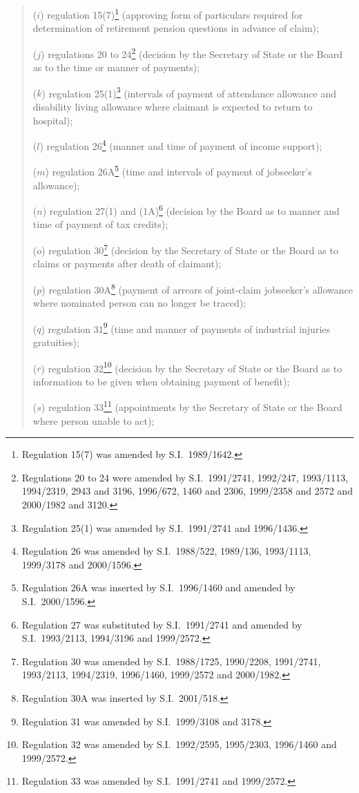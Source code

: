 \documentclass[12pt,a4paper]{article}
\begin{document}
\begin{enumerate}
\begin{quotation}
\begin{enumerate}
($i$) regulation 15(7)\footnote{Regulation 15(7) was amended by S.I.\ 1989/1642.} (approving form of particulars required for determination of retirement pension questions in advance of claim);

($j$) regulations 20 to 24\footnote{Regulations 20 to 24 were amended by S.I.\ 1991/2741, 1992/247, 1993/1113, 1994/2319, 2943 and 3196, 1996/672, 1460 and 2306, 1999/2358 and 2572 and 2000/1982 and 3120.} (decision by the Secretary of State or the Board as to the time or manner of payments);

($k$) regulation 25(1)\footnote{Regulation 25(1) was amended by S.I.\ 1991/2741 and 1996/1436.} (intervals of payment of attendance allowance and disability living allowance where claimant is expected to return to hospital);

($l$) regulation 26\footnote{Regulation 26 was amended by S.I.\ 1988/522, 1989/136, 1993/1113, 1999/3178 and 2000/1596.} (manner and time of payment of income support);

($m$) regulation 26A\footnote{Regulation 26A was inserted by S.I.\ 1996/1460 and amended by S.I.\ 2000/1596.} (time and intervals of payment of jobseeker’s allowance);

($n$) regulation 27(1) and (1A)\footnote{Regulation 27 was substituted by S.I.\ 1991/2741 and amended by S.I.\ 1993/2113, 1994/3196 and 1999/2572.} (decision by the Board as to manner and time of payment of tax credits);

($o$) regulation 30\footnote{Regulation 30 was amended by S.I.\ 1988/1725, 1990/2208, 1991/2741, 1993/2113, 1994/2319, 1996/1460, 1999/2572 and 2000/1982.} (decision by the Secretary of State or the Board as to claims or payments after death of claimant);

($p$) regulation 30A\footnote{Regulation 30A was inserted by S.I.\ 2001/518.} (payment of arrears of joint-claim jobseeker’s allowance where nominated person can no longer be traced);

($q$) regulation 31\footnote{Regulation 31 was amended by S.I.\ 1999/3108 and 3178.} (time and manner of payments of industrial injuries gratuities);

($r$) regulation 32\footnote{Regulation 32 was amended by S.I.\ 1992/2595, 1995/2303, 1996/1460 and 1999/2572.} (decision by the Secretary of State or the Board as to information to be given when obtaining payment of benefit);

($s$) regulation 33\footnote{Regulation 33 was amended by S.I.\ 1991/2741 and 1999/2572.} (appointments by the Secretary of State or the Board where person unable to act);


\end{enumerate}
\end{quotation}
\end{enumerate}
\end{document}
